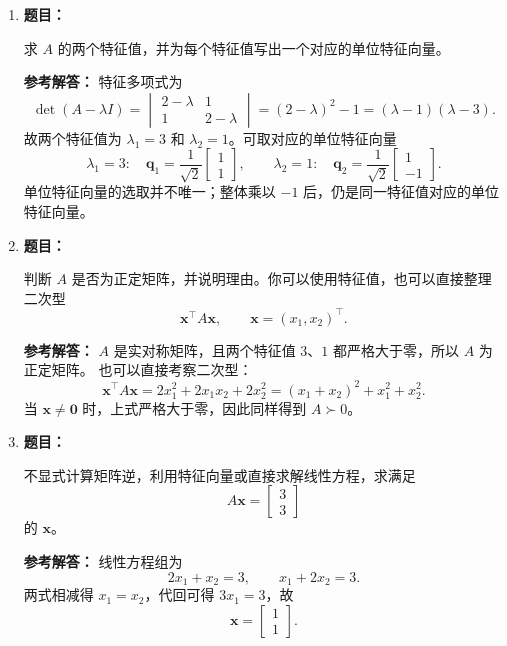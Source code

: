 \documentclass[11pt,a4paper]{article}
\newcommand{\ans}{\textcolor{answerblue}{\textbf{参考解答：}}}
\newenvironment{question}{%
  \par\begingroup\color{black!82}\noindent\textbf{题目：}\ignorespaces
}{%
  \par\endgroup\smallskip
}
\begin{document}
\begin{enumerate}
  \item
  \begin{question}
  求 $A$ 的两个特征值，并为每个特征值写出一个对应的单位特征向量。
  \end{question}
  \ans
  特征多项式为
  \[
    \det(A-\lambda I)
    =\begin{vmatrix}2-\lambda&1\\1&2-\lambda\end{vmatrix}
    =(2-\lambda)^2-1
    =(\lambda-1)(\lambda-3).
  \]
  故两个特征值为 $\lambda_1=3$ 和 $\lambda_2=1$。可取对应的单位特征向量
  \[
    \lambda_1=3:\quad
    \bm q_1=\frac{1}{\sqrt2}\begin{bmatrix}1\\1\end{bmatrix},
    \qquad
    \lambda_2=1:\quad
    \bm q_2=\frac{1}{\sqrt2}\begin{bmatrix}1\\-1\end{bmatrix}.
  \]
  单位特征向量的选取并不唯一；整体乘以 $-1$ 后，仍是同一特征值对应的单位特征向量。

  \item
  \begin{question}
  判断 $A$ 是否为正定矩阵，并说明理由。你可以使用特征值，也可以直接整理二次型
  \[
    \bm x^\top A\bm x,\qquad \bm x=(x_1,x_2)^\top.
  \]

  \end{question}
  \ans
  $A$ 是实对称矩阵，且两个特征值 $3$、$1$ 都严格大于零，所以 $A$ 为正定矩阵。
  也可以直接考察二次型：
  \[
    \bm x^\top A\bm x
    =2x_1^2+2x_1x_2+2x_2^2
    =(x_1+x_2)^2+x_1^2+x_2^2.
  \]
  当 $\bm x\ne\bm0$ 时，上式严格大于零，因此同样得到 $A\succ0$。

  \item
  \begin{question}
  不显式计算矩阵逆，利用特征向量或直接求解线性方程，求满足
  \[
    A\bm x=\begin{bmatrix}3\\3\end{bmatrix}
  \]
  的 $\bm x$。
  \end{question}
  \ans
  线性方程组为
  \[
    2x_1+x_2=3,
    \qquad
    x_1+2x_2=3.
  \]
  两式相减得 $x_1=x_2$，代回可得 $3x_1=3$，故
  \[
    \boxed{\bm x=\begin{bmatrix}1\\1\end{bmatrix}}.
  \]
\end{enumerate}
\end{document}
